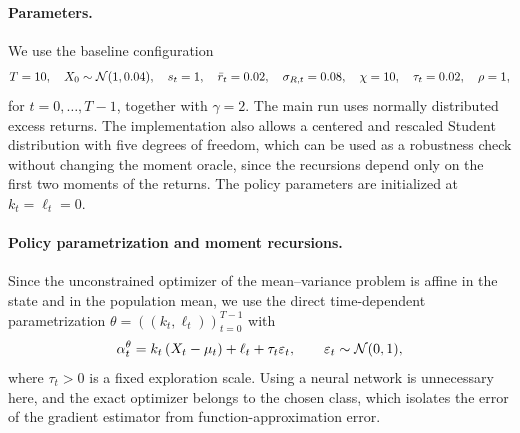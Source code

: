 \paragraph{Parameters.}
We use the baseline configuration
\begin{align}
    T=10,\quad X_0\sim{\cal N}(1,0.04),\quad s_t=1,\quad \bar r_t=0.02,\quad \sigma_{R,t}=0.08,\quad \chi=10,\quad \tau_t=0.02,\quad \rho=1,
\end{align}
for $t=0,\ldots,T-1$, together with $\gamma=2$. The main run uses normally distributed excess returns. The implementation also allows a centered and rescaled Student distribution with five degrees of freedom, which can be used as a robustness check without changing the moment oracle, since the recursions depend only on the first two moments of the returns. The policy parameters are initialized at $k_t=\ell_t=0$.

\paragraph{Policy parametrization and moment recursions.}
Since the unconstrained optimizer of the mean--variance problem is affine in the state and in the population mean, we use the direct time-dependent parametrization $\theta=((k_t,\ell_t))_{t=0}^{T-1}$ with
\begin{align}
    \alpha_t^\theta = k_t\left(X_t-\mu_t\right)+\ell_t+\tau_t\varepsilon_t,
    \qquad
    \varepsilon_t\sim{\cal N}(0,1),
    \label{eq:portfolio-policy}
\end{align}
where $\tau_t>0$ is a fixed exploration scale. Using a neural network is unnecessary here, and the exact optimizer belongs to the chosen class, which isolates the error of the gradient estimator from function-approximation error.

